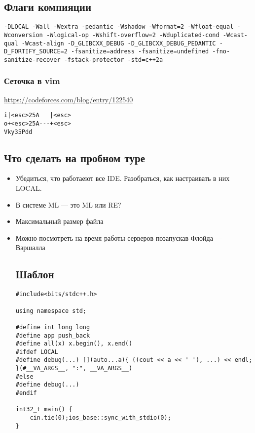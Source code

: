 \subsection{Флаги компияции}
\texttt{-DLOCAL -Wall -Wextra -pedantic -Wshadow -Wformat=2 -Wfloat-equal -Wconversion -Wlogical-op -Wshift-overflow=2 -Wduplicated-cond -Wcast-qual -Wcast-align -D\_GLIBCXX\_DEBUG -D\_GLIBCXX\_DEBUG\_PEDANTIC -D\_FORTIFY\_SOURCE=2 -fsanitize=address -fsanitize=undefined -fno-sanitize-recover -fstack-protector -std=c++2a}
\subsubsection{Сеточка в vim}
\underline{\url{https://codeforces.com/blog/entry/122540}}

\begin{lstlisting}
i|<esc>25A   |<esc>
o+<esc>25A---+<esc>
Vky35Pdd
\end{lstlisting}
\subsection{Что сделать на пробном туре}
\begin{itemize}
\item Убедиться, что работаеют все IDE.
Разобраться, как настраивать в них LOCAL.
\item В системе ML --- это ML или RE?
\item Максимальный размер файла
\item Можно посмотреть на время работы серверов позапускав Флойда --- Варшалла
\subsection{Шаблон}
\begin{lstlisting}
#include<bits/stdc++.h>

using namespace std;

#define int long long
#define app push_back
#define all(x) x.begin(), x.end()
#ifdef LOCAL
#define debug(...) [](auto...a){ ((cout << a << ' '), ...) << endl; }(#__VA_ARGS__, ":", __VA_ARGS__)
#else
#define debug(...)
#endif

int32_t main() {
    cin.tie(0);ios_base::sync_with_stdio(0);
}
\end{lstlisting}
\end{itemize}
